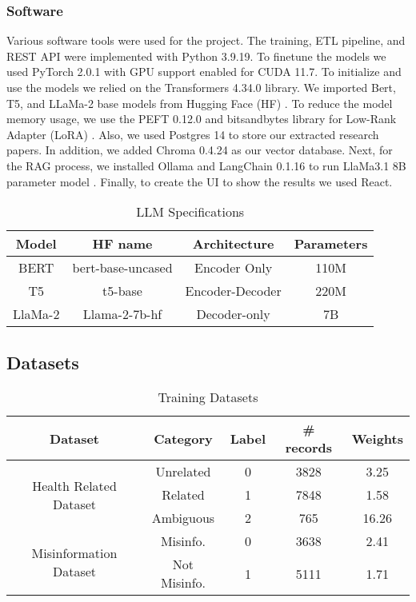 \subsubsection{Software}
Various software tools were used for the project. The training, ETL pipeline, and REST API were implemented with Python 3.9.19. To finetune the models we used PyTorch 2.0.1 with GPU support enabled for
CUDA 11.7. To initialize and use the models we relied on  the Transformers 4.34.0 library. We imported Bert, T5, and LLaMa-2 base models from Hugging Face (HF) \cite{huggingface}. To reduce the model memory usage, we use the PEFT 0.12.0 and bitsandbytes library for Low-Rank Adapter (LoRA) \cite{hu2021loralowrankadaptationlarge}. Also, we used Postgres 14 to store our extracted research papers. In addition, we added Chroma 0.4.24 as our vector database. Next, for the RAG process, we installed Ollama \cite{ollama} and LangChain 0.1.16 to run LlaMa3.1 8B parameter model \cite{touvron2023llamaopenefficientfoundation}. Finally, to create the UI to show the results we used React.

  \begin{table}[htbp]
\centering
\caption{LLM Specifications}
{\scriptsize
\begin{tabular}{||c | c | c | c||} 
 \hline
\textbf{Model} & \textbf{HF name} & \textbf{Architecture} & \textbf{Parameters} \\
 \hline
 BERT & bert-base-uncased & Encoder Only & 110M \\ 
 \hline
 T5 & t5-base & Encoder-Decoder & 220M \\
 \hline
 LlaMa-2 & Llama-2-7b-hf & Decoder-only & 7B \\
 \hline
\end{tabular}
}
\label{table:LLM}
\end{table}

\subsection{Datasets}

\begin{table}[htbp]
	\centering
	\caption{Training Datasets}
	{\scriptsize
	\begin{tabular}{||c | c | c | c | c||} 
		\hline
		\textbf{Dataset} &
		\textbf{Category} & \textbf{Label} & \textbf{\# records} & \textbf{Weights} \\
		\hline
		\multirow{3}{6.1em}{Health Related Dataset} & Unrelated & 0 & 3828 & 3.25  \\
		& Related & 1 & 7848 & 1.58  \\ 
		& Ambiguous & 2 & 765 & 16.26 \\
		\hline
		\multirow{2}{6.1em}{Misinformation Dataset} & Misinfo. & 0 & 3638 & 2.41\\ 
		& Not Misinfo. & 1 & 5111 & 1.71 \\
		\hline
	\end{tabular}
	}
	\label{table:dataset}
\end{table}

